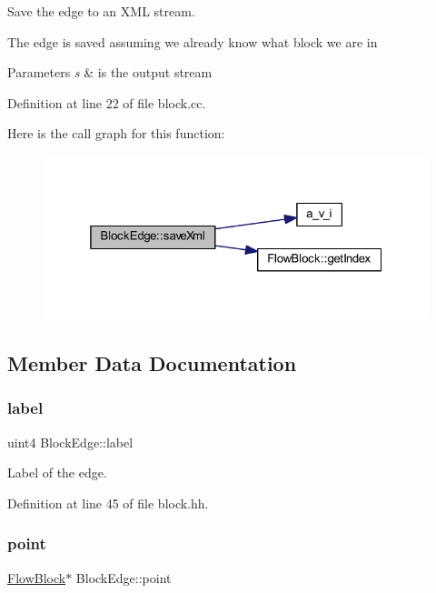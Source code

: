 Save the edge to an X\+ML stream. 

The edge is saved assuming we already know what block we are in 
\begin{DoxyParams}{Parameters}
{\em s} & is the output stream \\
\hline
\end{DoxyParams}


Definition at line 22 of file block.\+cc.

Here is the call graph for this function\+:
\nopagebreak
\begin{figure}[H]
\begin{center}
\leavevmode
\includegraphics[width=325pt]{struct_block_edge_a2ab8ffe65ffd12f7fa0e682395549fc4_cgraph}
\end{center}
\end{figure}


\subsection{Member Data Documentation}
\mbox{\label{struct_block_edge_a8e5e3a0500c81abaa9fcaf1360227076}} 
\subsubsection{\texorpdfstring{label}{label}}
{\footnotesize\ttfamily uint4 Block\+Edge\+::label}



Label of the edge. 



Definition at line 45 of file block.\+hh.

\mbox{\label{struct_block_edge_a993d5aa765b4ffd516f8e59cefbbe470}} 
\subsubsection{\texorpdfstring{point}{point}}
{\footnotesize\ttfamily \mbox{\hyperlink{class_flow_block}{Flow\+Block}}$\ast$ Block\+Edge\+::point}



